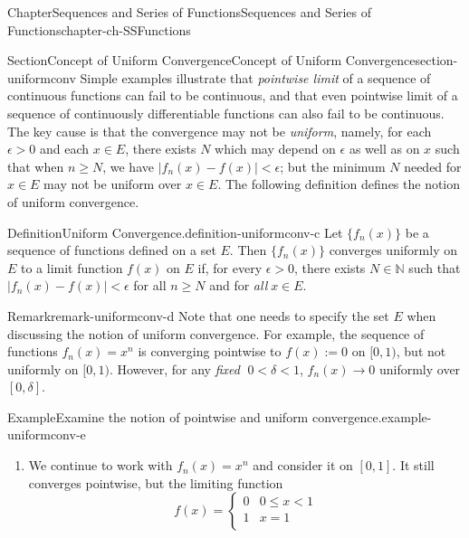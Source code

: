 \documentclass[oneside,10pt,]{book}
\numberwithin{equation}{section}
\newcommand{\lt}{<}
\newcommand{\amp}{&}
\begin{document}
\begin{chapterptx}{Chapter}{Sequences and Series of Functions}{}{Sequences and Series of Functions}{}{}{chapter-ch-SSFunctions}
%
%
\typeout{************************************************}
\typeout{************************************************}
%
\begin{sectionptx}{Section}{Concept of Uniform Convergence}{}{Concept of Uniform Convergence}{}{}{section-uniformconv}
Simple examples illustrate  that \emph{pointwise limit} of a sequence of continuous functions can fail to be continuous, and that even pointwise limit of a sequence of continuously differentiable functions can also fail to be continuous. The key cause is that the convergence may not be \emph{uniform}, namely, for each \(\epsilon >0\) and each \(x\in E\), there exists \(N\) which may depend on \(\epsilon\) as well as on \(x\) such that when \(n\ge N\), we have \(|f_n(x)-f(x)| < \epsilon\); but the minimum \(N\) needed for \(x\in E\) may not be uniform over \(x\in E\). The following definition defines the notion of uniform convergence.%
\begin{definition}{Definition}{Uniform Convergence.}{definition-uniformconv-c}%
Let \(\{ f_n(x)\}\) be a sequence of functions defined on a set \(E\). Then \(\{ f_n(x)\}\) converges uniformly on \(E\) to a limit function \(f(x)\) on \(E\) if, for every \(\epsilon >0\), there exists \(N\in \mathbb N\) such that \(|f_n(x)-f(x)| < \epsilon\) for all \(n\ge N\) and for \emph{all}\(\; x\in E\).\end{definition}
\begin{remark}{Remark}{}{remark-uniformconv-d}%
Note that one needs to specify the set \(E\) when discussing the notion of uniform convergence. For example, the sequence of functions \(f_{n}(x)=x^{n}\) is converging pointwise to \(f(x):=0\) on \([0,1)\), but not uniformly on \([0,1)\). However, for any \emph{fixed} \(\; 0 < \delta < 1\), \(f_{n}(x) \to 0\) uniformly over \([0,\delta]\).%
\end{remark}
\begin{example}{Example}{Examine the notion of pointwise and uniform convergence.}{example-uniformconv-e}%
%
\begin{enumerate}
\item{}We continue to work with \(f_{n}(x)=x^{n}\) and consider it on \([0, 1]\). It still converges pointwise, but the limiting function%
\begin{equation*}
f(x)=\begin{cases} 0 \amp 0\le x \lt 1 \\
1 \amp x=1\\
\end{cases}

\end{equation*}
\end{enumerate}
\end{example}
\end{sectionptx}
\end{chapterptx}
\end{document}
